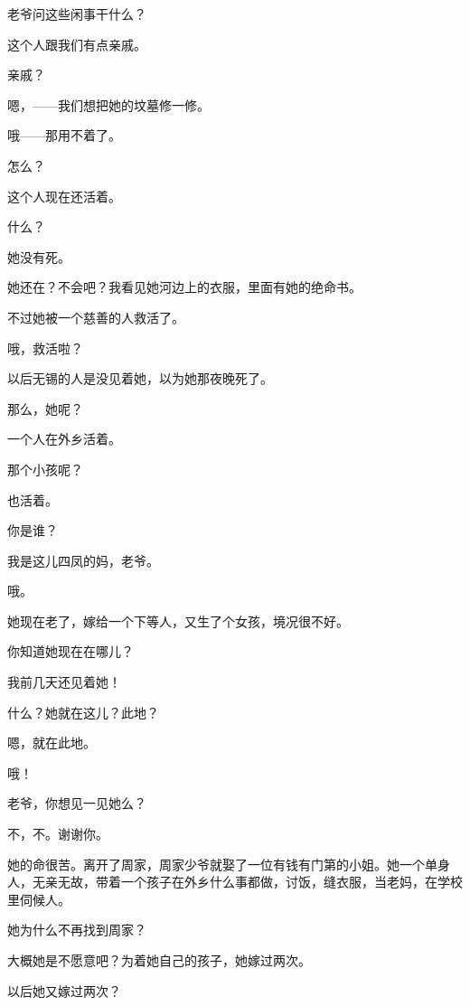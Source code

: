 老爷问这些闲事干什么？

这个人跟我们有点亲戚。

亲戚？

嗯，——我们想把她的坟墓修一修。

哦——那用不着了。

怎么？

这个人现在还活着。

什么？

她没有死。

她还在？不会吧？我看见她河边上的衣服，里面有她的绝命书。

不过她被一个慈善的人救活了。

哦，救活啦？

以后无锡的人是没见着她，以为她那夜晚死了。

那么，她呢？

一个人在外乡活着。

那个小孩呢？

也活着。

你是谁？

我是这儿四凤的妈，老爷。

哦。

她现在老了，嫁给一个下等人，又生了个女孩，境况很不好。

你知道她现在在哪儿？

我前几天还见着她！

什么？她就在这儿？此地？

嗯，就在此地。

哦！

老爷，你想见一见她么？

不，不。谢谢你。

她的命很苦。离开了周家，周家少爷就娶了一位有钱有门第的小姐。她一个单身人，无亲无故，带着一个孩子在外乡什么事都做，讨饭，缝衣服，当老妈，在学校里伺候人。

她为什么不再找到周家？

大概她是不愿意吧？为着她自己的孩子，她嫁过两次。

以后她又嫁过两次？

